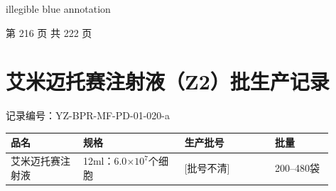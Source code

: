 \documentclass[UTF8,10pt,a4paper,fontset=fandol]{ctexart}
\newcommand{\fieldvalue}[1]{#1}
\newcommand{\handwritten}[1]{#1}
\begin{document}
\fieldvalue{\handwritten{illegible blue annotation}}

\vfill
\begin{center}
第 216 页 共 222 页
\end{center}

\newpage

\section*{艾米迈托赛注射液（Z2）批生产记录}

\noindent
记录编号：YZ-BPR-MF-PD-01-020-a

\vspace{0.3em}

\begin{center}
\small
\begin{tabular}{|p{0.20\linewidth}|p{0.29\linewidth}|p{0.25\linewidth}|p{0.16\linewidth}|}
\hline
品名 & 规格 & 生产批号 & 批量 \\
\hline
\fieldvalue{艾米迈托赛注射液}
&
\fieldvalue{12ml：6.0$\times 10^{7}$个细胞}
&
\fieldvalue{\handwritten{[批号不清]}}
&
\fieldvalue{200--480袋}
\\
\hline
\end{tabular}
\end{center}

\vspace{0.4em}
\end{document}

